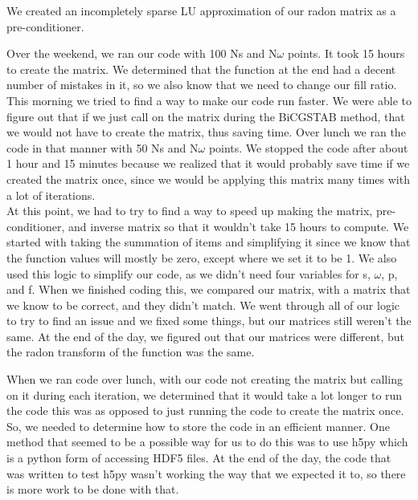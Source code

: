 \documentclass[12pt]{article}
\begin{document}
We created an incompletely sparse LU approximation of our radon matrix as a pre-conditioner. 

Over the weekend, we ran our code with 100 Ns and N$\omega$ points. It took 15 hours to create the matrix. We determined that the function at the end had a decent number of mistakes in it, so we also know that we need to change our fill ratio.\\

This morning we tried to find a way to make our code run faster. We were able to figure out that if we just call on the matrix during the BiCGSTAB method, that we would not have to create the matrix, thus saving time. Over lunch we ran the code in that manner with 50 Ns and N$\omega$ points. We stopped the code after about 1 hour and 15 minutes because we realized that it would probably save time if we created the matrix once, since we would be applying this matrix many times with a lot of iterations. \\

At this point, we had to try to find a way to speed up making the matrix, pre-conditioner, and inverse matrix so that it wouldn't take 15 hours to compute. We started with taking the summation of items and simplifying it since we know that the function values will mostly be zero, except where we set it to be 1. We also used this logic to simplify our code, as we didn't need four variables for s, $\omega$, p, and f. When we finished coding this, we compared our matrix, with a matrix that we know to be correct, and they didn't match. We went through all of our logic to try to find an issue and we fixed some things, but our matrices still weren't the same. At the end of the day, we figured out that our matrices were different, but the radon transform of the function was the same. 

When we ran code over lunch, with our code not creating the matrix but calling on it during each iteration, we determined that it would take a lot longer to run the code this was as opposed to just running the code to create the matrix once. So, we needed to determine how to store the code in an efficient manner. One method that seemed to be a possible way for us to do this was to use h5py which is a python form of accessing HDF5 files. At the end of the day, the code that was written to test h5py wasn't working the way that we expected it to, so there is more work to be done with that. 
\end{document}
